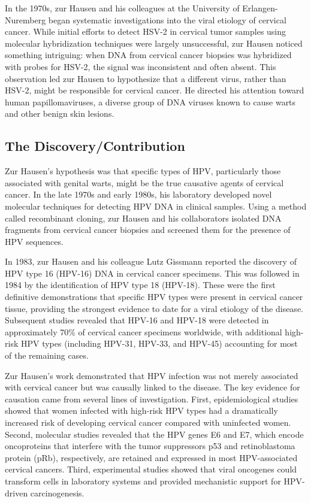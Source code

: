 In the 1970s, zur Hausen and his colleagues at the University of Erlangen-Nuremberg began systematic investigations into the viral etiology of cervical cancer. While initial efforts to detect HSV-2 in cervical tumor samples using molecular hybridization techniques were largely unsuccessful, zur Hausen noticed something intriguing: when DNA from cervical cancer biopsies was hybridized with probes for HSV-2, the signal was inconsistent and often absent. This observation led zur Hausen to hypothesize that a different virus, rather than HSV-2, might be responsible for cervical cancer. He directed his attention toward human papillomaviruses, a diverse group of DNA viruses known to cause warts and other benign skin lesions.

\subsection{The Discovery/Contribution}

Zur Hausen's hypothesis was that specific types of HPV, particularly those associated with genital warts, might be the true causative agents of cervical cancer. In the late 1970s and early 1980s, his laboratory developed novel molecular techniques for detecting HPV DNA in clinical samples. Using a method called recombinant cloning, zur Hausen and his collaborators isolated DNA fragments from cervical cancer biopsies and screened them for the presence of HPV sequences.

In 1983, zur Hausen and his colleague Lutz Gissmann reported the discovery of HPV type 16 (HPV-16) DNA in cervical cancer specimens. This was followed in 1984 by the identification of HPV type 18 (HPV-18). These were the first definitive demonstrations that specific HPV types were present in cervical cancer tissue, providing the strongest evidence to date for a viral etiology of the disease. Subsequent studies revealed that HPV-16 and HPV-18 were detected in approximately 70\% of cervical cancer specimens worldwide, with additional high-risk HPV types (including HPV-31, HPV-33, and HPV-45) accounting for most of the remaining cases.

Zur Hausen's work demonstrated that HPV infection was not merely associated with cervical cancer but was causally linked to the disease. The key evidence for causation came from several lines of investigation. First, epidemiological studies showed that women infected with high-risk HPV types had a dramatically increased risk of developing cervical cancer compared with uninfected women. Second, molecular studies revealed that the HPV genes E6 and E7, which encode oncoproteins that interfere with the tumor suppressors p53 and retinoblastoma protein (pRb), respectively, are retained and expressed in most HPV-associated cervical cancers. Third, experimental studies showed that viral oncogenes could transform cells in laboratory systems and provided mechanistic support for HPV-driven carcinogenesis.

